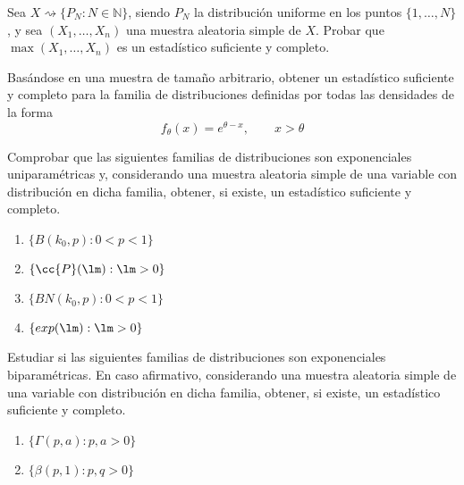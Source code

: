 \begin{ejercicio}
    Sea $X\rightsquigarrow\{P_N : N\in \mathbb{N}\}$, siendo $P_N$ la distribución uniforme en los puntos $\{1,\ldots,N\}$, y sea $(X_1, \ldots, X_n)$ una muestra aleatoria simple de $X$. Probar que $\max(X_1, \ldots, X_n)$ es un estadístico suficiente y completo.
\end{ejercicio}

\begin{ejercicio}
    Basándose en una muestra de tamaño arbitrario, obtener un estadístico suficiente y completo para la familia de distribuciones definidas por todas las densidades de la forma
    \begin{equation*}
        f_\theta(x) = e^{\theta-x}, \qquad x>\theta
    \end{equation*}
\end{ejercicio}

\begin{ejercicio}
    Comprobar que las siguientes familias de distribuciones son exponenciales uniparamétricas y, considerando una muestra aleatoria simple de una variable con distribución en dicha familia, obtener, si existe, un estadístico suficiente y completo.
    \begin{enumerate}[label=\alph*)]
        \item $\{B(k_0,p) : 0<p<1\}$
        \item $\{\cc{P}(\lm) : \lm>0\}$
        \item $\{BN(k_0,p) : 0<p<1\}$
        \item $\{exp(\lm) : \lm>0\}$
    \end{enumerate}
\end{ejercicio}

\begin{ejercicio}
    Estudiar si las siguientes familias de distribuciones son exponenciales biparamétricas.  En caso afirmativo, considerando una muestra aleatoria simple de una variable con distribución en dicha familia, obtener, si existe, un estadístico suficiente y completo.
    \begin{enumerate}[label=\alph*)]
        \item $\{\Gamma(p,a) : p,a>0\}$
        \item $\{\beta(p,1) : p,q>0\}$
    \end{enumerate}
\end{ejercicio}
